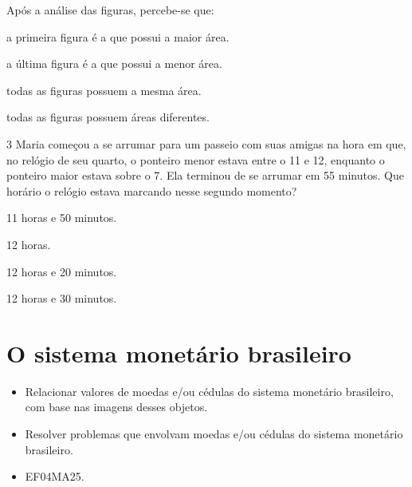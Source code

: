 Após a análise das figuras, percebe-se que:

\begin{escolha}
\item
  a primeira figura é a que possui a maior área.
\item
  a última figura é a que possui a menor área.
\item
  todas as figuras possuem a mesma área.
\item
  todas as figuras possuem áreas diferentes.
\end{escolha}

\num{3} Maria começou a se arrumar para um passeio com suas amigas na hora em
que, no relógio de seu quarto, o ponteiro menor estava entre o 11 e 12, enquanto o ponteiro maior estava sobre o 7. Ela terminou de se arrumar em 55 minutos. Que horário
o relógio estava marcando nesse segundo momento?

\begin{escolha}
\item
  11 horas e 50 minutos.
\item
  12 horas.
\item
  12 horas e 20 minutos.
\item
  12 horas e 30 minutos.
\end{escolha}


\chapter{O sistema monetário brasileiro}


\begin{itemize}
\item Relacionar valores de moedas e/ou cédulas do sistema monetário
brasileiro, com base nas imagens desses objetos.

\item Resolver problemas que envolvam moedas e/ou cédulas do sistema
monetário brasileiro.
\end{itemize}


\begin{itemize}
  \item EF04MA25.
\end{itemize}

